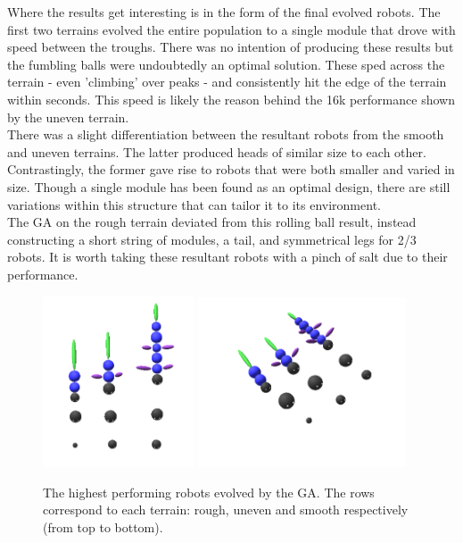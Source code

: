\documentclass{article}
\begin{document}
Where the results get interesting is in the form of the final evolved robots. The first two terrains evolved the entire population to a single module that drove with speed between the troughs. There was no intention of producing these results but the fumbling balls were undoubtedly an optimal solution. These sped across the terrain - even 'climbing' over peaks - and consistently hit the edge of the terrain within seconds. This speed is likely the reason behind the 16k performance shown by the uneven terrain. \\
There was a slight differentiation between the resultant robots from the smooth and uneven terrains. The latter produced heads of similar size to each other. Contrastingly, the former gave rise to robots that were both smaller and varied in size. Though a single module has been found as an optimal design, there are still variations within this structure that can tailor it to its environment. \\
The GA on the rough terrain deviated from this rolling ball result, instead constructing a short string of modules, a tail, and symmetrical legs for 2/3 robots. It is worth taking these resultant robots with a pinch of salt due to their performance.

\begin{figure}[H]
\centering
\includegraphics[width=0.4\textwidth]{best-above}
\includegraphics[width=0.55\textwidth]{best-side}
\caption{The highest performing robots evolved by the GA. The rows correspond to each terrain: rough, uneven and smooth respectively (from top to bottom).}
\end{figure}
\end{document}
